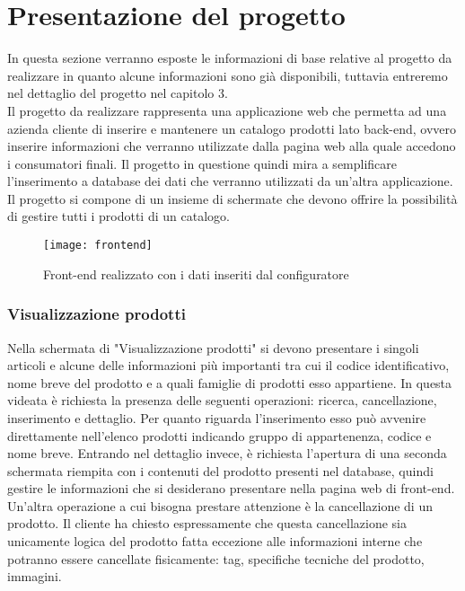 \section{Presentazione del progetto}
In questa sezione verranno esposte le informazioni di base relative al progetto da realizzare in quanto alcune informazioni sono già disponibili, tuttavia entreremo nel dettaglio del progetto nel capitolo 3.
\\
Il progetto da realizzare rappresenta una applicazione web che permetta ad una azienda cliente di inserire e mantenere un catalogo prodotti lato back-end, ovvero inserire informazioni che verranno utilizzate dalla pagina web alla quale accedono i consumatori finali. 
Il progetto in questione quindi mira a semplificare l'inserimento a database dei dati che verranno utilizzati da un'altra applicazione.\\
Il progetto si compone di un insieme di schermate che devono offrire la possibilità di gestire tutti i prodotti di un catalogo. 


\begin{figure}[!h] 
	\centering 
	\texttt{[image: frontend]} 
	\caption{Front-end realizzato con i dati inseriti dal configuratore}
	\label{ImgFrontend}
\end{figure}

\subsubsection{Visualizzazione prodotti}
Nella schermata di "Visualizzazione prodotti" si devono presentare i singoli articoli e alcune delle informazioni più importanti tra cui il codice identificativo, nome breve del prodotto e a quali famiglie di prodotti esso appartiene. In questa videata è richiesta la presenza delle seguenti operazioni: ricerca, cancellazione, inserimento e dettaglio.
Per quanto riguarda l'inserimento esso può avvenire direttamente nell'elenco prodotti indicando gruppo di appartenenza, codice e nome breve.
Entrando nel dettaglio invece, è richiesta l'apertura di una seconda schermata riempita con i contenuti del prodotto presenti nel database, quindi gestire le informazioni che si desiderano presentare nella pagina web di front-end.
Un'altra operazione a cui bisogna prestare attenzione è la cancellazione di un prodotto. Il cliente ha chiesto espressamente che questa cancellazione sia unicamente logica del prodotto fatta eccezione alle informazioni interne che potranno essere cancellate fisicamente: tag, specifiche tecniche del prodotto, immagini.

